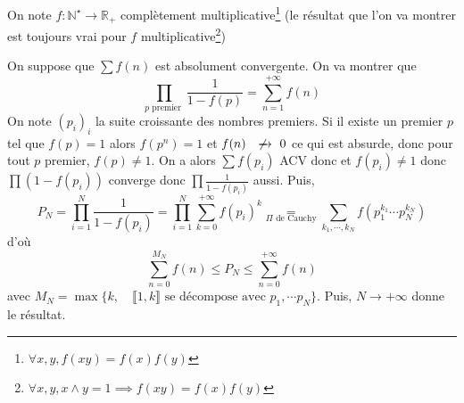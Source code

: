 \begin{ex}
    On note $f:\mathbb N^\star\longrightarrow \mathbb R_+$ complètement multiplicative\footnote{$\forall x,y, f(xy)=f(x)f(y)$} (le résultat que l'on va montrer est toujours vrai pour $f$ multiplicative\footnote{$\forall x,y, x\land y=1\implies f(xy)=f(x)f(y)$})

    On suppose que $\sum f(n)$ est absolument convergente. On va montrer que \[
        \prod_{p\text{ premier }} \frac1{1-f(p)}=\sum_{n=1}^{+\infty}f(n)
    \]
    On note $(p_i)_i$ la suite croissante des nombres premiers. Si il existe un premier $p$ tel que $f(p)=1$ alors $f(p^n)=1$ et $f(n)\xnrightarrow{}0$ ce qui est absurde, donc pour tout $p$ premier, $f(p)\neq 1$.
    On a alors $\sum f(p_i)$ ACV donc et $f(p_i)\neq 1$ donc $\prod (1-f(p_i))$ converge donc $\prod \frac1{1-f(p_i)}$ aussi. Puis, \[
        P_N=\prod_{i=1}^N\frac1{1-f(p_i)}=\prod_{i=1}^N \sum_{k=0}^{+\infty}f(p_i)^k\underset{\Pi\text{ de Cauchy}}=\sum_{k_1, \cdots, k_N}f(p_1^{k_1}\cdots p_N^{k_N})
    \]
    d'où \[
        \sum_{n=0}^{M_N}f(n)\leq P_N\leq\sum_{n=0}^{+\infty}f(n)
    \]
    avec $M_N=\max \{k, \quad \llbracket 1, k\rrbracket\text{ se décompose avec } p_1, \cdots p_N\}$. Puis, $N\to+\infty$ donne le résultat.
\end{ex}

\endchapter
